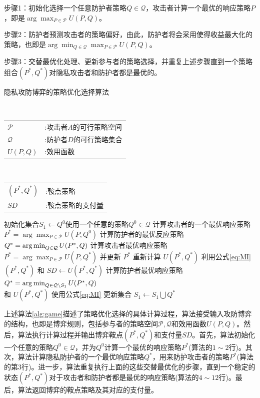 步骤1：初始化选择一个任意防护者策略$Q \in \mathcal{Q}$，攻击者计算一个最优的响应策略$P$，即是$\arg \max_{P \in \mathcal{P}}U(P,Q)$。

步骤2：防护者预测攻击者的策略偏好，由此，防护者将会采用使得收益最大化的策略，也即是$\arg \min_{Q \in \mathcal{Q}}\max_{P \in \mathcal{P}}U(P,Q)$。

步骤3：交替最优化处理、更新参与者的策略选择，并重复上述步骤直到一个策略组合$(P^*,Q^*)$对隐私攻击者和防护者都是最优的。

\begin{algorithm}[htbp]
    \small
	\caption{隐私攻防博弈的策略优化选择算法}
	\label{alg:game}
	\begin{algorithmic}[1]
		\REQUIRE ~~\\
            \begin{tabular}[t]{p{8mm}l}
            $\mathcal{P}$&:攻击者$A$的可行策略空间\\
            $\mathcal{Q}$&:防护者$D$的可行策略集合\\
            $U(P,Q)$&:效用函数
            \end{tabular}
		\ENSURE ~~\\
            \begin{tabular}[t]{p{8mm}l}
            $(P^*,Q^*)$&:鞍点策略\\
            $SD$&:鞍点策略的支付量
            \end{tabular}
		\STATE 初始化集合$S_1 \leftarrow Q^0$使用一个任意的策略$Q^0 \in \mathcal{Q}$
		\STATE 计算攻击者的一个最优响应策略$P^* = \arg \max_{P\in \mathcal{P}}U(P,Q^0)$
		\STATE 计算防护者的最优反应策略$Q^* = \operatorname*{arg\,min}_{Q \in \mathcal{Q}}U(P^*,Q)$
		\STATE 计算攻击者最优响应策略$P^* = \arg \max_{P\in \mathcal{P}}U(P,Q^*)$
		并更新 $P^*$ 重新计算 $U(P^*,Q^*)$ 利用公式\ref{eq:MI}
		\RETURN $(P^*,Q^*)$ 和 $SD \leftarrow U(P^*,Q^*)$
		\ELSE
		\STATE 计算防护者最优响应策略 $Q^*=\operatorname*{arg\,min}_{Q \in \mathcal{Q}\setminus S_1}U(P^*,Q)$\\
		和 $U(P^*,Q^*)$ 使用公式\ref{eq:MI}
		\STATE 更新集合 $S_1 \leftarrow S_1 \bigcup Q^*$
		\ENDIF
		\ENDWHILE
	\end{algorithmic}
\end{algorithm}

上述算法\ref{alg:game}描述了策略优化选择的具体计算过程，算法接受输入攻防博弈的结构，也即是博弈规则，包括参与者的策略空间$\mathcal{P},\mathcal{Q}$和效用函数$U(P,Q)$。然后，算法执行计算过程并输出博弈鞍点$(P^*,Q^*)$和支付量$SD$。首先，算法初始化一个任意的策略$Q^0 \in \mathcal{Q}$，并为$Q^0$计算一个最优的响应策略$P^*$(算法的$1 \sim 2$行)。其次，算法计算隐私防护者的一个最优响应策略$Q^*$，用来防护攻击者的策略$P^*$(算法的第$3$行)。进一步，算法重复执行上面的这些交替最优化的步骤，直到一个稳定的状态$(P^*,Q^*)$对于攻击者和防护者都是最优的响应策略(算法的$4 \sim 12$行)。最后，算法返回博弈的鞍点策略及其对应的支付量。

